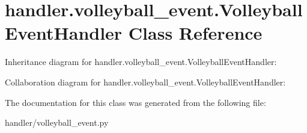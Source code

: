 \hypertarget{classhandler_1_1volleyball__event_1_1_volleyball_event_handler}{}\section{handler.\+volleyball\+\_\+event.\+Volleyball\+Event\+Handler Class Reference}
\label{classhandler_1_1volleyball__event_1_1_volleyball_event_handler}


Inheritance diagram for handler.\+volleyball\+\_\+event.\+Volleyball\+Event\+Handler\+:


Collaboration diagram for handler.\+volleyball\+\_\+event.\+Volleyball\+Event\+Handler\+:


The documentation for this class was generated from the following file\+:\begin{DoxyCompactItemize}
\item 
handler/volleyball\+\_\+event.\+py\end{DoxyCompactItemize}
